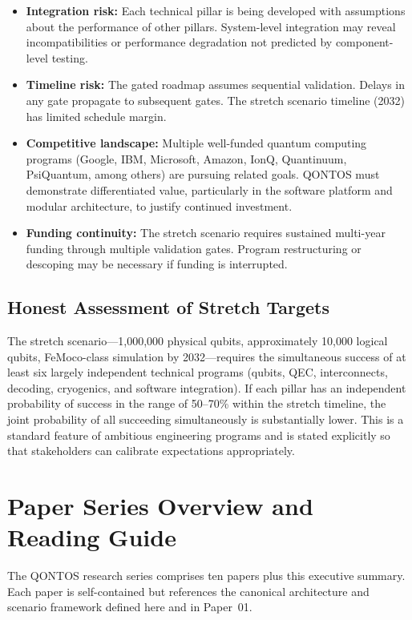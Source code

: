 \documentclass[conference]{IEEEtran}
\begin{document}
\begin{itemize}
\item \textbf{Integration risk:} Each technical pillar is being developed with assumptions about the performance of other pillars. System-level integration may reveal incompatibilities or performance degradation not predicted by component-level testing.
\item \textbf{Timeline risk:} The gated roadmap assumes sequential validation. Delays in any gate propagate to subsequent gates. The stretch scenario timeline (2032) has limited schedule margin.
\item \textbf{Competitive landscape:} Multiple well-funded quantum computing programs (Google, IBM, Microsoft, Amazon, IonQ, Quantinuum, PsiQuantum, among others) are pursuing related goals. QONTOS must demonstrate differentiated value, particularly in the software platform and modular architecture, to justify continued investment.
\item \textbf{Funding continuity:} The stretch scenario requires sustained multi-year funding through multiple validation gates. Program restructuring or descoping may be necessary if funding is interrupted.
\end{itemize}

\subsection{Honest Assessment of Stretch Targets}

The stretch scenario---1,000,000 physical qubits, approximately 10,000 logical qubits, FeMoco-class simulation by 2032---requires the simultaneous success of at least six largely independent technical programs (qubits, QEC, interconnects, decoding, cryogenics, and software integration). If each pillar has an independent probability of success in the range of 50--70\% within the stretch timeline, the joint probability of all succeeding simultaneously is substantially lower. This is a standard feature of ambitious engineering programs and is stated explicitly so that stakeholders can calibrate expectations appropriately.

\section{Paper Series Overview and Reading Guide}

The QONTOS research series comprises ten papers plus this executive summary. Each paper is self-contained but references the canonical architecture and scenario framework defined here and in Paper~01.
\end{document}
